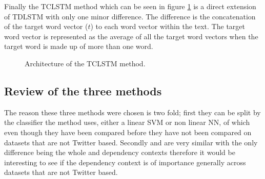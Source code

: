 Finally the TCLSTM method which can be seen in figure \ref{fig:repro_tclstm_method} is a direct extension of TDLSTM with only one minor difference. The difference is the concatenation of the target word vector ($t$) to each word vector within the text. The target word vector is represented as the average of all the target word vectors when the target word is made up of more than one word.

\begin{figure}[!ht]
    \centering
    
    \caption{Architecture of the TCLSTM method.}
    \label{fig:repro_tclstm_method}
\end{figure}

\subsection{Review of the three methods}
The reason these three methods were chosen is two fold; first they can be split by the classifier the method uses, either a linear SVM or non linear NN, of which even though they have been compared before \cite{repro_tang_2016, repro_wang_2017} they have not been compared on datasets that are not Twitter based. Secondly \citet{repro_vo_2015} and \citet{repro_wang_2017} are very similar with the only difference being the whole and dependency contexts therefore it would be interesting to see if the dependency context is of importance generally across datasets that are not Twitter based.


